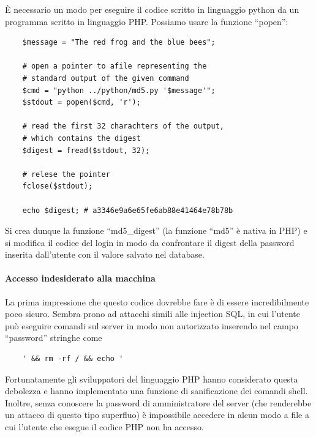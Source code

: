È necessario un modo per eseguire il codice scritto in linguaggio python da un programma scritto in linguaggio PHP. Possiamo usare la funzione ``popen'':
\lstset{language=php}
\begin{lstlisting}
    $message = "The red frog and the blue bees";

    # open a pointer to afile representing the 
    # standard output of the given command
    $cmd = "python ../python/md5.py '$message'";
    $stdout = popen($cmd, 'r');
    
    # read the first 32 charachters of the output,
    # which contains the digest
    $digest = fread($stdout, 32);

    # relese the pointer
    fclose($stdout);

    echo $digest; # a3346e9a6e65fe6ab88e41464e78b78b
\end{lstlisting}

Si crea dunque la funzione ``md5\_digest'' (la funzione ``md5'' è nativa in PHP) e si modifica il codice del login in modo da confrontare il digest della password inserita dall'utente con il valore salvato nel database.

\paragraph{Accesso indesiderato alla macchina}
La prima impressione che questo codice dovrebbe fare è di essere incredibilmente poco sicuro. Sembra prono ad attacchi simili alle injection SQL, in cui l'utente può eseguire comandi sul server in modo non autorizzato inserendo nel campo ``password'' stringhe come
\begin{verbatim}
    ' && rm -rf / && echo '
\end{verbatim}

Fortunatamente gli sviluppatori del linguaggio PHP hanno considerato questa debolezza e hanno implementato una funzione di sanificazione dei comandi shell. Inoltre, senza conoscere la password di amministratore del server (che renderebbe un attacco di questo tipo superfluo) è impossibile accedere in alcun modo a file a cui l'utente che esegue il codice PHP non ha accesso.
